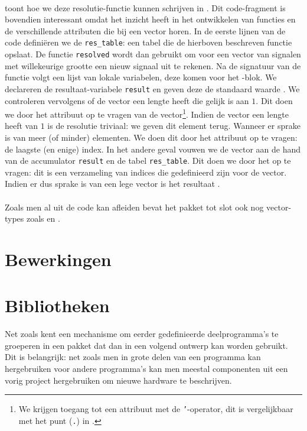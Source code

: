 \paragraph{}
 toont hoe we deze resolutie-functie kunnen schrijven in \tvhdl{}. Dit code-fragment is bovendien interessant omdat het inzicht heeft in het ontwikkelen van functies en de verschillende attributen die bij een vector horen. In de eerste lijnen van de code defini\"eren we de \texttt{res\_table}: een tabel die de hierboven beschreven functie opslaat. De functie \texttt{resolved} wordt dan gebruikt om voor een vector van signalen met willekeurige grootte een nieuw signaal uit te rekenen. Na de signatuur van de functie volgt een lijst van lokale variabelen, deze komen voor het -blok. We declareren de resultaat-variabele \texttt{result} en geven deze de standaard waarde . We controleren vervolgens of de vector een lengte heeft die gelijk is aan $1$. Dit doen we door het  attribuut op te vragen van de vector\footnote{We krijgen toegang tot een attribuut met de \texttt{'}-operator, dit is vergelijkbaar met het punt (\texttt{.}) in \tjava{}.}. Indien de vector een lengte heeft van $1$ is de resolutie triviaal: we geven dit element terug. Wanneer er sprake is van meer (of minder) elementen. We doen dit door het  attribuut op te vragen: de laagste (en enige) index. In het andere geval vouwen we de vector aan de hand van de accumulator \texttt{result} en de tabel \texttt{res\_table}. Dit doen we door het  op te vragen: dit is een verzameling van indices die gedefinieerd zijn voor de vector. Indien er dus sprake is van een lege vector is het resultaat .

\paragraph{}
Zoals men al uit de code kan afleiden bevat het pakket tot slot ook nog vector-types zoals  en .

\section{Bewerkingen}

\section{Bibliotheken}
Net zoals \tjava{} kent \tvhdl{} een mechanisme om eerder gedefinieerde deelprogramma's te groeperen in een pakket dat dan in een volgend ontwerp kan worden gebruikt. Dit is belangrijk: net zoals men in \tjava{} grote delen van een programma kan hergebruiken voor andere programma's kan men meestal componenten uit een vorig project hergebruiken om nieuwe hardware te beschrijven.

